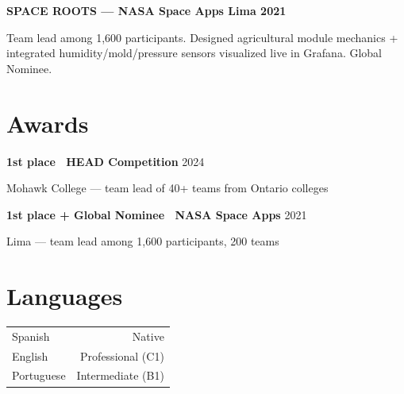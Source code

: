 \documentclass[10pt,letterpaper]{article}
\begin{document}
\noindent\textbf{SPACE ROOTS --- NASA Space Apps Lima 2021}\par
Team lead among 1{,}600 participants. Designed agricultural module mechanics + integrated humidity/mold/pressure sensors visualized live in Grafana. Global Nominee.

\begin{minipage}[t]{0.62\linewidth}
  \section*{Awards}
  \textbf{1st place \textperiodcentered\ HEAD Competition} \hfill \textcolor{inkmute}{\small 2024}\par
  \textcolor{inkdim}{\footnotesize Mohawk College --- team lead of 40+ teams from Ontario colleges}\par
  \vspace{3pt}
  \textbf{1st place + Global Nominee \textperiodcentered\ NASA Space Apps} \hfill \textcolor{inkmute}{\small 2021}\par
  \textcolor{inkdim}{\footnotesize Lima --- team lead among 1{,}600 participants, 200 teams}
\end{minipage}
\hfill
\begin{minipage}[t]{0.34\linewidth}
  \section*{Languages}
  \begin{tabularx}{\linewidth}{@{}X r@{}}
    Spanish     & \textcolor{inkmute}{\small Native} \\
    English     & \textcolor{inkmute}{\small Professional (C1)} \\
    Portuguese  & \textcolor{inkmute}{\small Intermediate (B1)} \\
  \end{tabularx}
\end{minipage}
\end{document}
